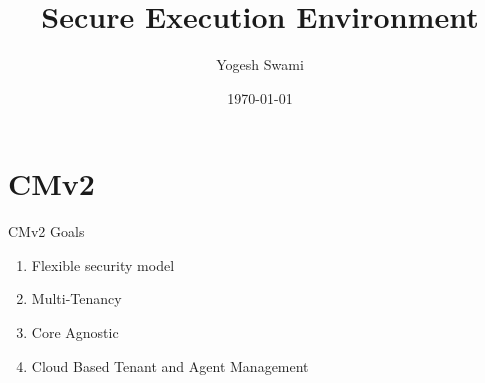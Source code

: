 \documentclass[handout,xcolor=svgnames]{beamer}
\title
  [SEE\hspace{2em}]
  {Secure Execution Environment}
\author[]
  {Yogesh Swami}
\date
  {\today}
\institute
  {Cryptography Research,\\a division of Rambus}
\begin{document}
\section{CMv2}

\maketitle

\begin{frame}
  {CMv2 Goals}

  \begin{enumerate}
  \item Flexible security model\pause
  \item Multi-Tenancy\pause
  \item Core Agnostic\pause
  \item Cloud Based Tenant and Agent Management
  \end{enumerate}
\end{frame}
\end{document}

